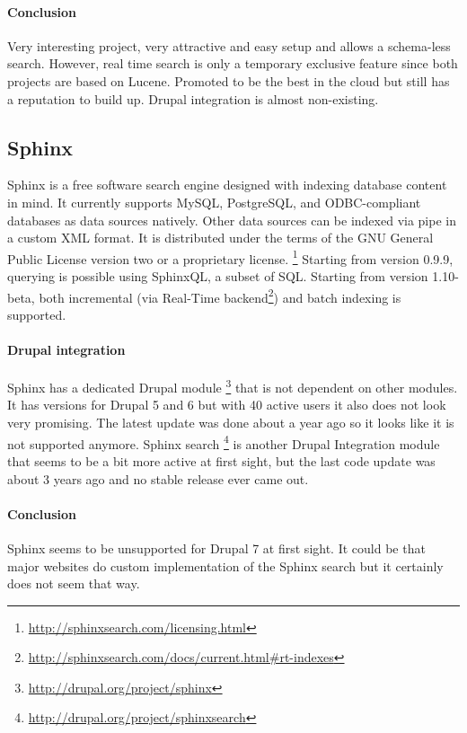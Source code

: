 \paragraph{Conclusion}
Very interesting project, very attractive and easy setup and allows a schema-less search. However, real time search is only a temporary exclusive feature since both projects are based on Lucene. Promoted to be the best in the cloud but still has a reputation to build up. Drupal integration is almost non-existing.

\subsection{Sphinx}
Sphinx is a free software search engine designed with indexing database content in mind. It currently supports MySQL, PostgreSQL, and ODBC-compliant databases as data sources natively. Other data sources can be indexed via pipe in a custom XML format. It is distributed under the terms of the GNU General Public License version two or a proprietary license. \footnote{\url{http://sphinxsearch.com/licensing.html}}
Starting from version 0.9.9, querying is possible using SphinxQL, a subset of SQL. Starting from version 1.10-beta, both incremental (via Real-Time backend\footnote{\url{http://sphinxsearch.com/docs/current.html\#rt-indexes}}) and batch indexing is supported.

\paragraph{Drupal integration}
Sphinx has a dedicated Drupal module \footnote{\url{http://drupal.org/project/sphinx}} that is not dependent on other modules. It has versions for Drupal 5 and 6 but with 40 active users it also does not look very promising. The latest update was done about a year ago so it looks like it is not supported anymore. Sphinx search \footnote{\url{http://drupal.org/project/sphinxsearch}} is another Drupal Integration module that seems to be a bit more active at first sight, but the last code update was about 3 years ago and no stable release ever came out. 

\paragraph{Conclusion}
Sphinx seems to be unsupported for Drupal 7 at first sight. It could be that major websites do custom implementation of the Sphinx search but it certainly does not seem that way. 

